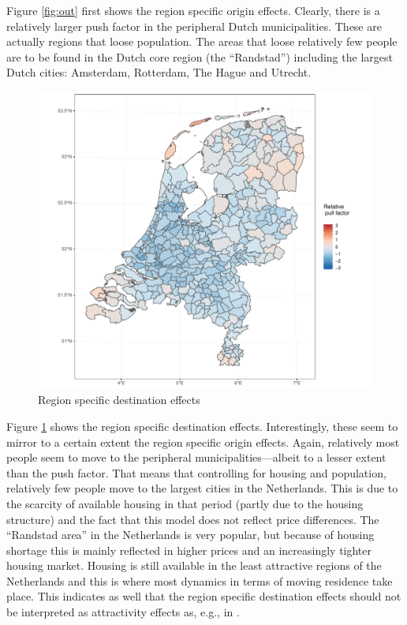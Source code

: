 \documentclass[fleqn,10pt]{SelfArx} %
\begin{document}
{{Figure \ref{fig:out} first shows the region specific origin effects. Clearly, there is a relatively larger push factor in the peripheral Dutch municipalities. These are actually regions that loose population. The areas that loose relatively few people are to be found in the Dutch core region (the ``Randstad'') including the largest Dutch cities: Amsterdam, Rotterdam, The Hague and Utrecht.  

\begin{figure}[h!]
	\centering
	\includegraphics[width = \columnwidth]{../fig/p_coef_in.pdf}
	\caption{Region specific destination effects}\label{fig:in}
\end{figure}

Figure \ref{fig:in} shows the region specific destination effects. Interestingly, these seem to mirror to a certain extent the region specific origin effects. Again, relatively most people seem to move to the peripheral municipalities---albeit to a lesser extent than the push factor. That means that controlling for housing and population, relatively few people move to the largest cities in the Netherlands. This is due to the scarcity of available housing in that period (partly due to the housing structure) and the fact that this model does not reflect price differences. The ``Randstad area'' in the Netherlands is very popular, but because of housing shortage this is mainly reflected in higher prices and an increasingly tighter housing market. Housing is still available in the least attractive regions of the Netherlands and this is where most dynamics in terms of moving residence take place. This indicates as well that the region specific destination effects should not be interpreted as attractivity effects as, e.g., in \citet{congdon2010random}.

}}
\end{document}
